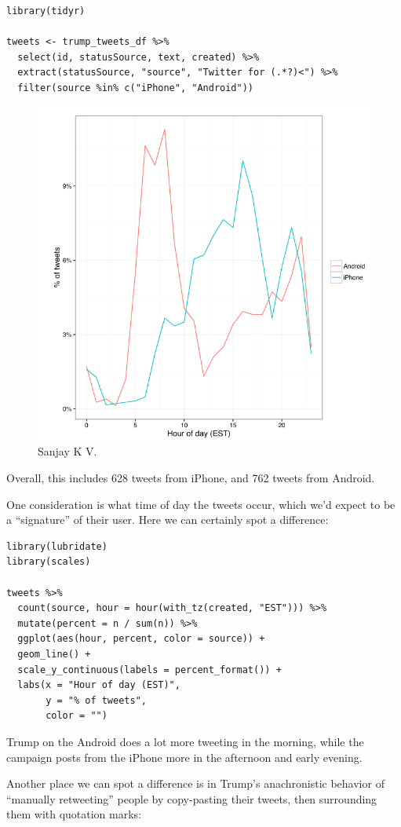 \documentclass[a4paper,12pt]{article}
\begin{document}
\begin{lstlisting}
library(tidyr)

tweets <- trump_tweets_df %>%
  select(id, statusSource, text, created) %>%
  extract(statusSource, "source", "Twitter for (.*?)<") %>%
  filter(source %in% c("iPhone", "Android"))
  \end{lstlisting}

  
  \begin{figure}[h!]
  \includegraphics[width=\linewidth]{Chunk.png}
  \caption{Sanjay K V.}
  \label{fig:Tweet by Todd Vaziri}
\end{figure}
Overall, this includes 628 tweets from iPhone, and 762 tweets from Android.

One consideration is what time of day the tweets occur, which we’d expect to be a “signature” of their user. Here we can certainly spot a difference:



\begin{lstlisting}
library(lubridate)
library(scales)

tweets %>%
  count(source, hour = hour(with_tz(created, "EST"))) %>%
  mutate(percent = n / sum(n)) %>%
  ggplot(aes(hour, percent, color = source)) +
  geom_line() +
  scale_y_continuous(labels = percent_format()) +
  labs(x = "Hour of day (EST)",
       y = "% of tweets",
       color = "")
  \end{lstlisting}

  
  Trump on the Android does a lot more tweeting in the morning, while the campaign posts from the iPhone more in the afternoon and early evening.

Another place we can spot a difference is in Trump’s anachronistic behavior of “manually retweeting” people by copy-pasting their tweets, then surrounding them with quotation marks:
\end{document}
